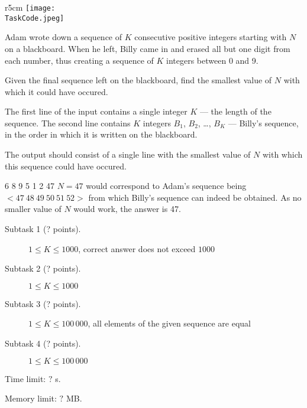 \documentclass{boi2014}
\renewcommand{\TaskCode}{sequence}
\begin{document}
    \begin{wrapfigure}{r}{5cm}
		\texttt{[image: \\TaskCode.jpeg]}
	\end{wrapfigure}

    Adam wrote down a sequence of $K$ consecutive positive integers starting
    with $N$ on a blackboard. When he left, Billy came in and erased all but one
    digit from each number, thus creating a sequence of $K$ integers between 0
    and 9.

    \Task

    Given the final sequence left on the blackboard, find the smallest
    value of $N$ with which it could have occured.

    \Input

    The first line of the input contains a single integer $K$ --- the length of
    the sequence. The second line contains $K$ integers $B_1$, $B_2$, \dots,
    $B_K$ --- Billy's sequence, in the order in which it is written on the
    blackboard.

    \Output

    The output should consist of a single line with the smallest value of
    $N$ with which this sequence could have occured.

    \Example

    \example
    {
        6 8 9 5 1 2
    }
    {
        47
    }
    {
        $N = 47$ would correspond to Adam's sequence
        being $<47\ 48\ 49\ 50\ 51\ 52>$ from which Billy's sequence
        can indeed be obtained. As no smaller value of $N$
        would work, the answer is 47.
    }

\Scoring

\begin{description}
    \item[Subtask 1 (? points).] $1 \le K \le 1000$, correct
        answer does not exceed $1000$
    \item[Subtask 2 (? points).] $1 \le K \le 1000$
    \item[Subtask 3 (? points).] $1 \le K \le 100\,000$, all
		elements of the given sequence are equal
    \item[Subtask 4 (? points).] $1 \le K \le 100\,000$
\end{description}

\Constraints

Time limit: $?$ s.

Memory limit: $?$ MB.
\end{document}
